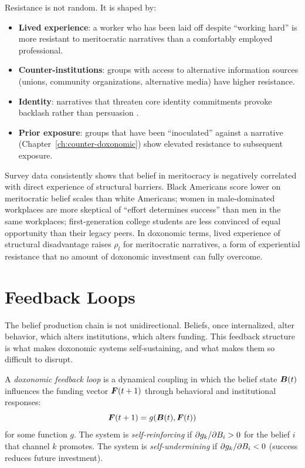 Resistance is not random.
It is shaped by:
\begin{itemize}[nosep]
  \item \textbf{Lived experience}: a worker who has been laid off despite ``working hard'' is more resistant to meritocratic narratives than a comfortably employed professional.
  \item \textbf{Counter-institutions}: groups with access to alternative information sources (unions, community organizations, alternative media) have higher resistance.
  \item \textbf{Identity}: narratives that threaten core identity commitments provoke backlash rather than persuasion \autocite{kahan2012}.
  \item \textbf{Prior exposure}: groups that have been ``inoculated'' against a narrative (Chapter~\ref{ch:counter-doxonomic}) show elevated resistance to subsequent exposure.
\end{itemize}

\begin{example}
\label{ex:resistance}
Survey data consistently shows that belief in meritocracy is negatively correlated with direct experience of structural barriers.
Black Americans score lower on meritocratic belief scales than white Americans; women in male-dominated workplaces are more skeptical of ``effort determines success'' than men in the same workplaces; first-generation college students are less convinced of equal opportunity than their legacy peers.
In doxonomic terms, lived experience of structural disadvantage raises $\rho_l$ for meritocratic narratives, a form of experiential resistance that no amount of doxonomic investment can fully overcome.
\end{example}


\section{Feedback Loops}
\label{sec:ch4-feedback}

The belief production chain is not unidirectional.
Beliefs, once internalized, alter behavior, which alters institutions, which alters funding.
This feedback structure is what makes doxonomic systems self-sustaining, and what makes them so difficult to disrupt.

\begin{definition}
\label{def:feedback}
A \emph{doxonomic feedback loop} is a dynamical coupling in which the belief state $\bm{B}(t)$ influences the funding vector $\bm{F}(t+1)$ through behavioral and institutional responses:
\[
  \bm{F}(t+1) = g(\bm{B}(t), \bm{F}(t))
\]
for some function $g$.
The system is \emph{self-reinforcing} if $\partial g_k / \partial B_{i} > 0$ for the belief $i$ that channel $k$ promotes.
The system is \emph{self-undermining} if $\partial g_k / \partial B_{i} < 0$ (success reduces future investment).
\end{definition}

